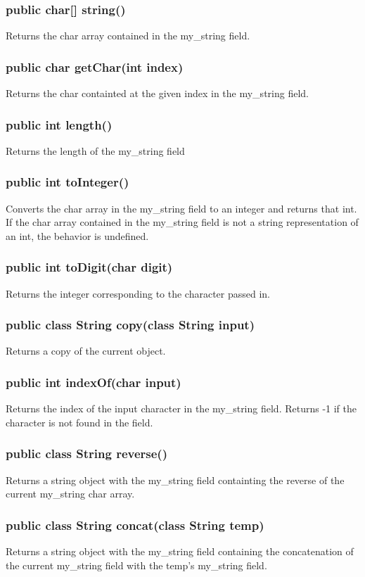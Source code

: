 \begin{homeworkProblem}
    \subsubsection{public char[] string()}
    Returns the char array contained in the my\_string field.
    \subsubsection{public char getChar(int index)}
    Returns the char containted at the given index in the my\_string field.
    \subsubsection{public int length()}
    Returns the length of the my\_string field
    \subsubsection{public int toInteger()}
    Converts the char array in the my\_string field to an integer and returns that int. If the char array contained in the my\_string field is not a  string representation of an int, the behavior is undefined.
    \subsubsection{public int toDigit(char digit)}
    Returns the integer corresponding to the character passed in.
    \subsubsection{public class String copy(class String input)}
    Returns a copy of the current object.
    \subsubsection{public int indexOf(char input)}
    Returns the index of the input character in the my\_string field. Returns -1 if the character is not found in the field.
    \subsubsection{public class String reverse()}
    Returns a string object with the my\_string field containting the reverse of the current my\_string char array.
    \subsubsection{public class String concat(class String temp)}
    Returns a string object with the my\_string field containing the concatenation of the current my\_string field with the temp's my\_string field.

\end{homeworkProblem}
